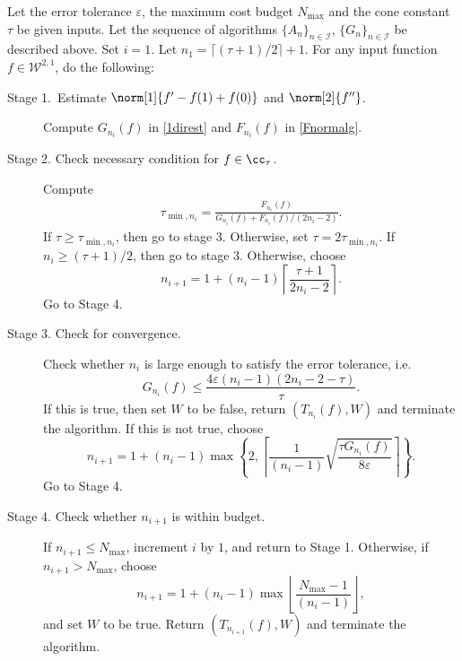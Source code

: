 \begin{algo} \label{multistageintegalgo}
Let the error tolerance $\varepsilon$, the maximum cost budget $N_{\text{max}}$ and the cone constant $\tau$ be given inputs. Let the sequence of algorithms $\{A_n\}_{n\in \mathcal{I}}$, $\{G_n\}_{n\in \mathcal{I}}$ be described above. Set $i=1$. Let $n_1=\lceil(\tau+1)/2\rceil+1$. For any input function $f\in \mathcal{W}^{2,1}$, do the following:
\begin{description}
\item[Stage 1.\ Estimate {$\norm[1]{f'-f(1)+f(0)}$} and {$\norm[2]{f''}$}.] Compute $G_{n_i}(f)$ in \eqref{1direst} and $F_{n_i}(f)$ in \eqref{Fnormalg}.

\item[Stage 2. Check necessary condition for $f \in \cc_{\tau}$.] Compute 
    \begin{align*}
     \tau_{\min,n_i} =  \frac{F_{n_i}(f)}{G_{n_i}(f)+F_{n_i}(f)/(2n_i-2)}.
    \end{align*}
If $\tau \ge \tau_{\min,n_i}$, then go to stage 3.  Otherwise, set $\tau = 2\tau_{\min,n_i}$.  If $n_i \ge (\tau+1)/2$, then go to stage 3.  Otherwise, choose 
$$
n_{i+1}=1+ (n_i-1)\left\lceil\frac{\tau+1}{2n_i-2}\right\rceil.
$$
Go to Stage 4.

\item[Stage 3. Check for convergence.] Check whether $n_i$ is large enough to satisfy the error tolerance, i.e.
    \begin{equation*}
     G_{n_i}(f) \le \frac{4\varepsilon(n_i-1)(2n_i-2 - \tau)}{\tau}.
    \end{equation*}
If this is true, then set $W$ to be false, return $(T_{n_i}(f),W)$ and terminate the algorithm.   If this is not true, choose
$$
n_{i+1}=1+ (n_i-1)\max\left\{2,\left\lceil\frac{1}{(n_i-1)}\sqrt{\frac{\tau G_{n_i}(f)}{8\varepsilon}}\right\rceil\right\}.
$$
Go to Stage 4.

\item[Stage 4. Check whether $n_{i+1}$ is within budget.] If $n_{i+1} \le N_{\max}$, increment $i$ by $1$, and return to Stage 1.  Otherwise, if $n_{i+1} > N_{\max}$, choose 
$$
n_{i+1}=1+ (n_i-1)\max\left\lfloor\frac{N_{\max}-1}{(n_i-1)}\right\rfloor,
$$
and set $W$ to be true. Return $(T_{n_{i+1}}(f),W)$ and terminate the algorithm.
\end{description}
\end{algo}

